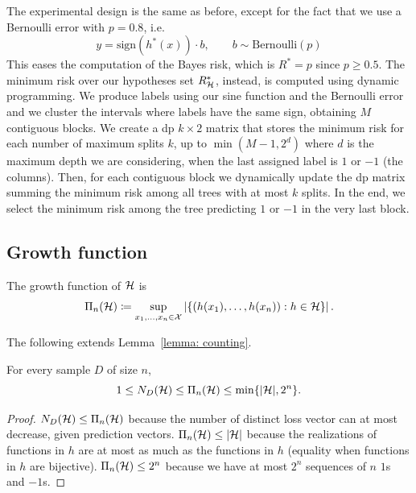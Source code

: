 \documentclass[reqno]{amsart}
\begin{document}
The experimental design is the same as before, except for the fact that we use a Bernoulli error with $p=0.8$, i.e. 
\[
y = \mathrm{sign}(h^*(x))\cdot b, \qquad b\sim \text{Bernoulli}(p)
\]
This eases the computation of the Bayes risk, which is $R^* = p$ since $p\ge0.5$. The minimum risk over our hypotheses set $R^*_{\mathcal{H}}$, instead, is computed using dynamic programming. We produce labels using our sine function and the Bernoulli error and we cluster the intervals where labels have the same sign, obtaining $M$ contiguous blocks. We create a dp $k\times 2$ matrix that stores the minimum risk for each number of maximum splits $k$, up to $\min(M-1, 2^d)$ where $d$ is the maximum depth we are considering, when the last assigned label is $1$ or $-1$ (the columns). Then, for each contiguous block we dynamically update the dp matrix summing the minimum risk among all trees with at most $k$ splits. In the end, we select the minimum risk among the tree predicting $1$ or $-1$ in the very last block. 


\subsection{Growth function}

\begin{definition}
    The growth function of $\mathcal{H}$ is
\[
 \Pi_{n}(\mathcal{H})\coloneq\sup_{x_1,\ldots,x_n\in\mathcal X}
 \left|\left\{(h(x_1),\ldots,h(x_n)):h\in\mathcal{H}\right\}\right|.
\]
\end{definition}

The following extends Lemma~\ref{lemma: counting}.

\begin{lemma}\label{lemma: growth}
For every sample $D$ of size $n$,
\[
 1\le N_D(\mathcal{H})\le\Pi_{n}(\mathcal{H})\le\min\{|\mathcal{H}|,2^n\}.
\]

\begin{proof}
    $N_D(\mathcal{H}) \le \Pi_{n}(\mathcal{H})$ because the number of distinct loss vector can at most decrease, given prediction vectors. $\Pi_{n}(\mathcal{H})\le \vert\mathcal{H}\vert$ because the realizations of functions in $h$ are at most as much as the functions in $h$ (equality when functions in $h$ are bijective). $\Pi_{n}(\mathcal{H})\le 2^n$ because we have at most $2^n$ sequences of $n$ $1$s and $-1$s.
\end{proof}
\end{lemma}
\end{document}
